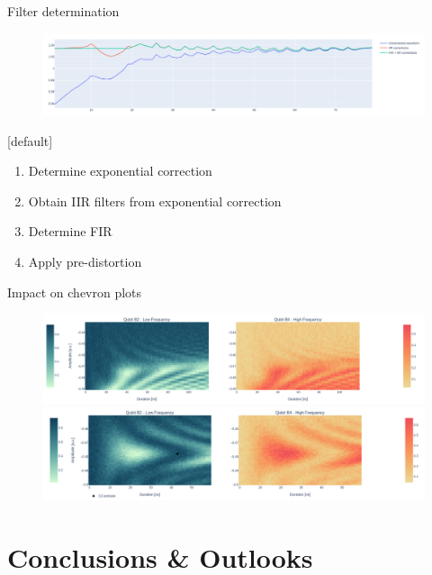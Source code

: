\documentclass[aspectratio=169,10pt]{beamer}
\begin{document}
\begin{frame}{Filter determination}
  \begin{figure}
    \centering
    \includegraphics[width=\textwidth]{figures/B4_ringin.png}
  \end{figure}
  \vspace{0.5em}
  {[default]
    \begin{enumerate}[leftmargin=*, label=\arabic*.]    
      \item Determine exponential correction
      \item Obtain IIR filters from exponential correction
      \item Determine FIR
      \item Apply pre-distortion
    \end{enumerate}}
\end{frame}

\begin{frame}{Impact on chevron plots}
  \begin{figure}
    \centering
    \includegraphics[width=\textwidth]{figures/B2B4_nofilter.png}
    \vfill
    \includegraphics[width=\textwidth]{figures/B2B4.png}
  \end{figure}
\end{frame}


\section{Conclusions \& Outlooks}
\end{document}
